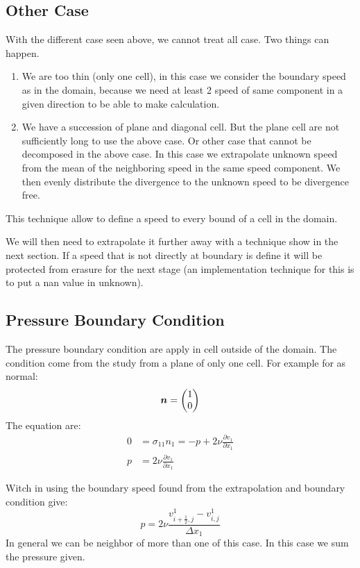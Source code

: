 \subsection{Other Case}
With the different case seen above, we cannot treat all case. Two things can happen.
\begin{enumerate}
	\item We are too thin (only one cell), in this case we consider the boundary speed as in the domain,
	because we need at least 2 speed of same component in a given direction to be able to make calculation.
	\item We have a succession of plane and diagonal cell. But the plane cell are not sufficiently long to use the above case.
	Or other case that cannot be decomposed in the above case.
	In this case we extrapolate unknown speed from the mean of the neighboring speed in the same speed component.
	We then evenly distribute the divergence to the unknown speed to be divergence free.
\end{enumerate}
This technique allow to define a speed to every bound of a cell in the domain.

We will then need to extrapolate it further away with a technique show in the next section.
If a speed that is not directly at boundary is define it will be protected from erasure for the next stage (an implementation technique for this
is to put a nan value in unknown).

\subsection{Pressure Boundary Condition}

The pressure boundary condition are apply in cell outside of the domain.
The condition come from the study from a plane of only one cell.
For example for as normal:
\begin{equation}
	{\boldsymbol {n}}=\begin{pmatrix}
			1\\
			0
		\end{pmatrix}
\end{equation}
The equation are:
\begin{align}
	0&=\sigma_{11}n_{1}=-p+2\nu\frac{\partial v_{1}}{\partial x_{1}}\\
	p&=2\nu\frac{\partial v_{1}}{\partial x_{1}}
\end{align}

Witch in using the boundary speed found from the extrapolation and boundary condition give:
\begin{equation}
	p=2\nu\frac{v^{1}_{i+\frac{1}{2},j}-v^{1}_{i,j}}{\Delta x_{1}}
\end{equation}
In general we can be neighbor of more than one of this case.
In this case we sum the pressure given.


